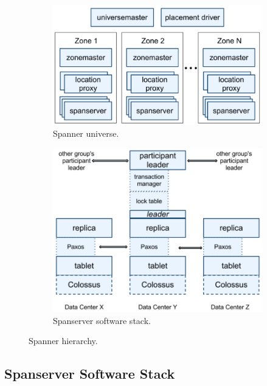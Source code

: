 \documentclass[onecolumn, a4paper, 10pt]{article}
\begin{document}
\begin{figure}[ht]
  \centering
  \begin{subfigure}{0.45\textwidth}
    \includegraphics[width = \textwidth]{figs/spanner-server-organization.png}
    \caption{Spanner universe.~\cite{Corbett:2012}}
    \label{subfig:spanner-universe}
  \end{subfigure}
  \hfill
  \begin{subfigure}{0.45\textwidth}
    \includegraphics[width = \textwidth]{figs/spanserver-software-stack.png}
    \caption{Spanserver software stack.~\cite{Corbett:2012}}
    \label{subfig:spanserver-software-stack}
  \end{subfigure}
  \caption{Spanner hierarchy.}
  \label{fig:spanner-hierarchy}
\end{figure}

\subsection{Spanserver Software Stack}
\label{subsec:spanserver-software-stack}
\end{document}
